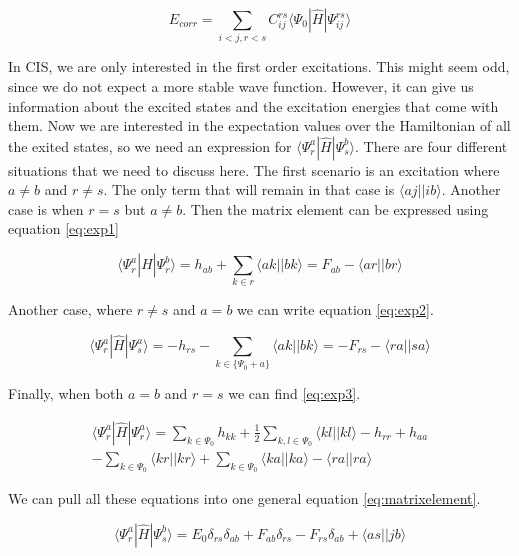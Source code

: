 \documentclass[twoside,twocolumn,9pt]{article}
\begin{document}
\begin{equation}\label{eq:doubles}
  E_{corr} = \sum_{i<j, r<s} C_{ij}^{rs}\langle \Psi_{0} |\hat{H}|\Psi_{ij}^{rs}\rangle
\end{equation}

In CIS, we are only interested in the first order excitations. This might seem odd, since we do not expect a more stable wave function. However, it can give us information about the
excited states and the excitation energies that come with them. Now we are interested in the expectation values over the Hamiltonian of all the exited states, so we need an expression
for $\langle \Psi_r^a |\hat{H}| \Psi_s^b \rangle$. There are four different situations that we need to discuss here\cite{Sherrill1996}. The first scenario is an excitation where
$a \neq b$ and $r \neq s$. The only term that will remain in that case is $\langle aj || ib \rangle$. Another case is when $r = s$ but $a \neq b$. Then the matrix element can be
expressed using equation \eqref{eq:exp1}

\begin{equation}\label{eq:exp1}
  \langle \Psi_r^a|\hat{H}|\Psi^b_r \rangle = h_{ab} + \sum_{k\in r} \langle ak || bk \rangle = F_{ab} - \langle ar||br \rangle
\end{equation}

Another case, where $r \neq s$ and $a = b$ we can write equation \eqref{eq:exp2}.

\begin{equation}\label{eq:exp2}
  \langle \Psi_r^a|\hat{H}|\Psi^a_s \rangle = -h_{rs} - \sum_{k \in \{\Psi_0 + a\}} \langle ak || bk \rangle = -F_{rs} - \langle ra || sa \rangle
\end{equation}

Finally, when both $a = b$ and $r = s$ we can find \eqref{eq:exp3}.

\begin{multline}\label{eq:exp3}
  \langle \Psi^a_r|\hat{H}|\Psi^a_r \rangle = \sum_{k \in \Psi_0}h_{kk} + \frac{1}{2}\sum_{k,l \in \Psi_0} \langle kl||kl \rangle - h_{rr} + h_{aa} \\ - \sum_{k \in \Psi_0} \langle
  kr || kr \rangle + \sum_{k \in \Psi_0} \langle ka||ka \rangle - \langle ra||ra \rangle
\end{multline}

We can pull all these equations into one general equation \eqref{eq:matrixelement}.

\begin{equation}\label{eq:matrixelement}
  \langle \Psi_r^a|\hat{H}|\Psi_s^b \rangle = E_0\delta_{rs}\delta_{ab} + F_{ab}\delta_{rs} - F_{rs}\delta_{ab} + \langle as || jb \rangle
\end{equation}
\end{document}
